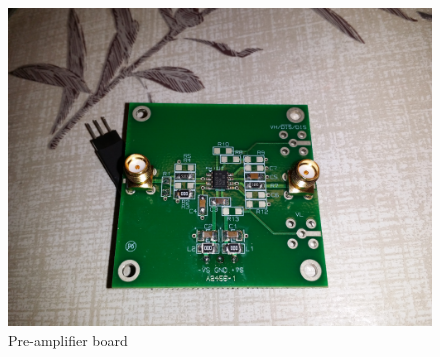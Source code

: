 \documentclass[a4paper]{article}
\begin{document}
\begin{appendices}
\begin{figure}[ht!]
\centering
\includegraphics[width=\textwidth]{fig/IMG_20201207_121010.jpg}
\caption{Pre-amplifier board}
\end{figure}


\end{appendices}
\end{document}
